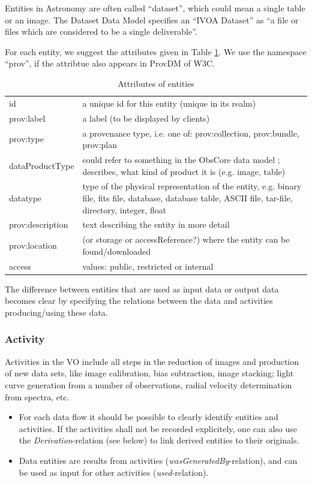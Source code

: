 Entities in Astronomy are often called ``dataset'', which could mean a single table or an image. The Dataset Data Model \citep{std:DatasetDM} specifies an ``IVOA Dataset'' as ``a file or files which are considered to be a single deliverable''. 

For each entity, we suggest the attributes given in Table \ref{tab:entity-attributes}. We use the namespace ``prov'', if the attribtue also appears in ProvDM of W3C.

\begin{table}[h]
\begin{tabular}[h]{lp{}}
id & a unique id for this entity (unique in its realm)\\
prov:label & a label (to be displayed by clients)\\
prov:type & a provenance type, i.e. one of: prov:collection, prov:bundle, prov:plan\\
dataProductType & could refer to something in the ObsCore data model \citep{std:ObsCore}; describes, what kind of product it is (e.g. image, table)\\
datatype & type of the physical representation of the entity, e.g. binary file, fits file, database, database table, ASCII file, tar-file, directory, integer, float\\
prov:description & text describing the entity in more detail\\
prov:location & (or storage or accessReference?) where the entity can be found/downloaded\\
access & values: public, restricted or internal
\end{tabular}
\caption{Attributes of entities}\label{tab:entity-attributes}
\end{table}

The difference between entities that are used as input data or output data 
becomes clear by specifying the relations between the data and activities producing/using these data.

\subsubsection{Activity}
Activities in the VO include all steps in the reduction of images and production of new data sets, like image calibration, bias subtraction, image stacking; light curve generation from a number of observations, radial velocity determination from spectra, etc.

\begin{itemize}
\item For each data flow it should be possible to clearly identify entities and activities. If the activities shall not be recorded explicitely, one can also use the \emph{Derivation}-relation (see below) to link derived entities to their originals.

\item Data entities are results from activities (\emph{wasGeneratedBy}-relation), and can be used as input for other activities (\emph{used}-relation). 

\end{itemize}

